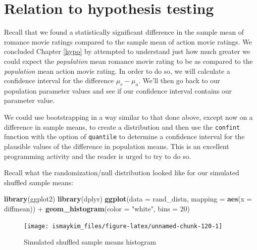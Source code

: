 \documentclass[]{tufte-book}
\newenvironment{Shaded}{\begin{snugshade}}{\end{snugshade}}
\newcommand{\KeywordTok}[1]{\textcolor[rgb]{0.13,0.29,0.53}{\textbf{{#1}}}}
\newcommand{\DataTypeTok}[1]{\textcolor[rgb]{0.13,0.29,0.53}{{#1}}}
\newcommand{\DecValTok}[1]{\textcolor[rgb]{0.00,0.00,0.81}{{#1}}}
\newcommand{\StringTok}[1]{\textcolor[rgb]{0.31,0.60,0.02}{{#1}}}
\newcommand{\NormalTok}[1]{{#1}}
\begin{document}
\section{Relation to hypothesis
testing}\label{relation-to-hypothesis-testing}

Recall that we found a statistically significant difference in the
sample mean of romance movie ratings compared to the sample mean of
action movie ratings. We concluded Chapter \ref{hypo} by attempted to
understand just how much greater we could expect the \emph{population}
mean romance movie rating to be as compared to the \emph{population}
mean action movie rating. In order to do so, we will calculate a
confidence interval for the difference \(\mu_r - \mu_a\). We'll then go
back to our population parameter values and see if our confidence
interval contains our parameter value.

We could use bootstrapping in a way similar to that done above, except
now on a difference in sample means, to create a distribution and then
use the \texttt{confint} function with the option of \texttt{quantile}
to determine a confidence interval for the plausible values of the
difference in population means. This is an excellent programming
activity and the reader is urged to try to do so.

Recall what the randomization/null distribution looked like for our
simulated shuffled sample means:

\begin{Shaded}
\begin{Highlighting}[]
\KeywordTok{library}\NormalTok{(ggplot2)}
\KeywordTok{library}\NormalTok{(dplyr)}
\KeywordTok{ggplot}\NormalTok{(}\DataTypeTok{data =} \NormalTok{rand_distn, }\DataTypeTok{mapping =} \KeywordTok{aes}\NormalTok{(}\DataTypeTok{x =} \NormalTok{diffmean)) +}
\StringTok{  }\KeywordTok{geom_histogram}\NormalTok{(}\DataTypeTok{color =} \StringTok{"white"}\NormalTok{, }\DataTypeTok{bins =} \DecValTok{20}\NormalTok{)}
\end{Highlighting}
\end{Shaded}

\begin{figure}

{\centering \texttt{[image: ismaykim\_files/figure-latex/unnamed-chunk-120-1]} 

}

\caption[Simulated shuffled sample means histogram]{Simulated shuffled sample means histogram}\label{fig:unnamed-chunk-120}
\end{figure}
\end{document}
